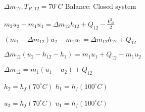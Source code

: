 \( \Delta m_{12}, T_{R,12} = 70^\circ C \)  
Balance: Closed system  

\( m_{2} u_{2} - m_{1} u_{1} = \Delta m_{12} h_{12} + Q_{12} - \frac{V_{12}^2}{2} \)  

\( (m_{1} + \Delta m_{12}) u_{2} - m_{1} u_{1} = \Delta m_{12} h_{12} + Q_{12} \)  

\( \Delta m_{12} (u_{2} - h_{12} - h_{1}) = m_{1} u_{1} + Q_{12} - m_{1} u_{2} \)  

\( \Delta m_{12} = m_{1} (u_{1} - u_{2}) + Q_{12} \)  

\( h_{2} = h_{f} (70^\circ C) \)  
\( h_{1} = h_{f} (100^\circ C) \)  

\( u_{2} = h_{f} (70^\circ C) \)  
\( u_{1} = h_{f} (100^\circ C) \)